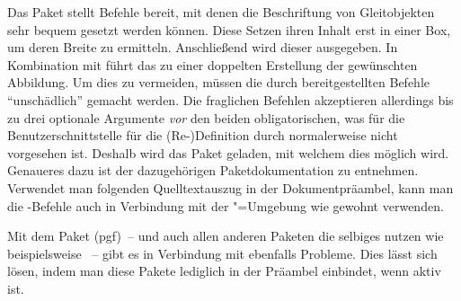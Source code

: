 Das Paket  stellt Befehle bereit, mit denen die Beschriftung 
von Gleitobjekten sehr bequem gesetzt werden können. Diese Setzen ihren Inhalt 
erst in einer Box, um deren Breite zu ermitteln. Anschließend wird dieser 
ausgegeben. In Kombination mit  führt das zu einer 
doppelten Erstellung der gewünschten Abbildung. Um dies zu vermeiden, müssen 
die durch  bereitgestellten Befehle \enquote{unschädlich} 
gemacht werden. Die fraglichen Befehlen akzeptieren allerdings bis zu drei 
optionale Argumente \emph{vor} den beiden obligatorischen, was für die 
Benutzerschnittstelle für die (Re-)Definition durch  
normalerweise nicht vorgesehen ist. Deshalb wird das Paket  
geladen, mit welchem dies möglich wird. Genaueres dazu ist der dazugehörigen 
Paketdokumentation zu entnehmen. Verwendet man folgenden Quelltextauszug in der 
Dokumentpräambel, kann man die -Befehle auch in Verbindung 
mit der "=Umgebung wie gewohnt verwenden.
%
\begin{quoting}
\begin{Code}
\usepackage{floatrow}
\usepackage{xparse}
\ifpdf\else
\fi
\end{Code}
\end{quoting}

Mit dem Paket (pgf)~-- und auch allen anderen Paketen die 
selbiges nutzen wie beispielsweise ~-- gibt es in Verbindung 
mit  ebenfalls Probleme. Dies lässt sich lösen, indem man 
diese Pakete lediglich in der Präambel einbindet, wenn  aktiv 
ist.
%
\begin{quoting}[rightmargin=0pt]
\begin{Code}
\ifpdf
  \usepackage{tikz}%
\fi
\end{Code}
\end{quoting}
